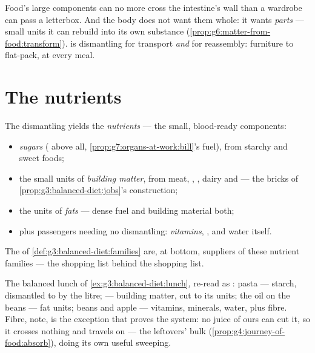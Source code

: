 \begin{remark}\label{rem:g7:digestion-and-nutrients:why}
Food's large components can no more cross the intestine's
wall than a wardrobe can pass a letterbox. And the body
does not want them whole: it wants \emph{parts} --- small
units it can rebuild into its own substance
(\cref{prop:g6:matter-from-food:transform}).  is
dismantling for transport \emph{and} for reassembly:
furniture to flat-pack, at every meal.
\end{remark}

\section{The nutrients}

\begin{definition}\label{def:g7:digestion-and-nutrients:families}
The dismantling yields the \emph{nutrients}
--- the small, blood-ready components:
\begin{itemize}
  \item \emph{sugars} ( above all,
        \cref{prop:g7:organs-at-work:bill}'s fuel), from
        starchy and sweet foods;
  \item the small units of \emph{building matter}, from
        meat, , , dairy and  --- the bricks
        of \cref{prop:g3:balanced-diet:jobs}'s
        construction;
  \item the units of \emph{fats} --- dense fuel and
        building material both;
  \item plus passengers needing no dismantling:
        \emph{vitamins}, \emph{}, and water
        itself.
\end{itemize}
The  of \cref{def:g3:balanced-diet:families}
are, at bottom, suppliers of these nutrient families ---
the shopping list behind the shopping list.
\end{definition}

\begin{example}\label{ex:g7:digestion-and-nutrients:lunch}
The balanced lunch of \cref{ex:g3:balanced-diet:lunch},
re-read as : pasta --- starch, dismantled to
 by the litre;  --- building matter, cut to its
units; the oil on the beans --- fat units; beans and apple
--- vitamins, minerals, water, plus fibre. Fibre, note, is
the exception that proves the system: no juice of ours can
cut it, so it crosses nothing and travels on --- the
leftovers' bulk (\cref{prop:g4:journey-of-food:absorb}),
doing its own useful sweeping.
\end{example}

